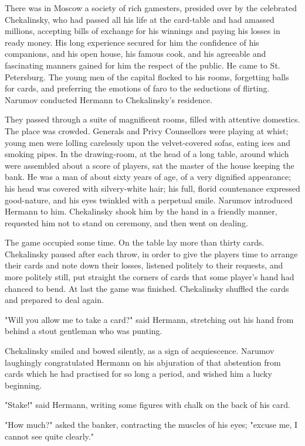 There was in Moscow a society of rich gamesters, presided over by the
celebrated Chekalinsky, who had passed all his life at the card-table
and had amassed millions, accepting bills of exchange for his winnings
and paying his losses in ready money. His long experience secured for
him the confidence of his companions, and his open house, his famous
cook, and his agreeable and fascinating manners gained for him the
respect of the public. He came to St. Petersburg. The young men of the
capital flocked to his rooms, forgetting balls for cards, and
preferring the emotions of faro to the seductions of flirting. Narumov
conducted Hermann to Chekalinsky's residence.

They passed through a suite of magnificent rooms, filled with
attentive domestics. The place was crowded. Generals and Privy
Counsellors were playing at whist; young men were lolling carelessly
upon the velvet-covered sofas, eating ices and smoking pipes. In the
drawing-room, at the head of a long table, around which were assembled
about a score of players, sat the master of the house keeping the
bank. He was a man of about sixty years of age, of a very dignified
appearance; his head was covered with silvery-white hair; his full,
florid countenance expressed good-nature, and his eyes twinkled with a
perpetual smile. Narumov introduced Hermann to him. Chekalinsky shook
him by the hand in a friendly manner, requested him not to stand on
ceremony, and then went on dealing.

The game occupied some time. On the table lay more than thirty cards.
Chekalinsky paused after each throw, in order to give the players time
to arrange their cards and note down their losses, listened politely
to their requests, and more politely still, put straight the corners
of cards that some player's hand had chanced to bend. At last the game
was finished. Chekalinsky shuffled the cards and prepared to deal
again.

"Will you allow me to take a card?" said Hermann, stretching out his
hand from behind a stout gentleman who was punting.

Chekalinsky smiled and bowed silently, as a sign of acquiescence.
Narumov laughingly congratulated Hermann on his abjuration of that
abstention from cards which he had practised for so long a period, and
wished him a lucky beginning.

"Stake!" said Hermann, writing some figures with chalk on the back of
his card.

"How much?" asked the banker, contracting the muscles of his eyes;
"excuse me, I cannot see quite clearly."

